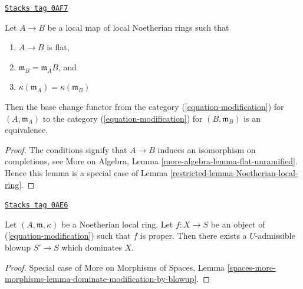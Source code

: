 \begin{lemma}
\label{restricted-lemma-equivalence-to-completion}
\href{https://stacks.math.columbia.edu/tag/0AF7}{\texttt{Stacks tag 0AF7}}

Let $A \to B$ be a local map of local Noetherian rings such that
\begin{enumerate}
\item $A \to B$ is flat,
\item $\mathfrak m_B = \mathfrak m_A B$, and
\item $\kappa(\mathfrak m_A) = \kappa(\mathfrak m_B)$
\end{enumerate}
Then the base change functor from the category
(\ref{equation-modification}) for $(A, \mathfrak m_A)$ to the category
(\ref{equation-modification}) for $(B, \mathfrak m_B)$
is an equivalence.
\end{lemma}

\begin{proof}

The conditions signify that $A \to B$ induces an isomorphism on
completions, see
More on Algebra, Lemma \ref{more-algebra-lemma-flat-unramified}.
Hence this lemma is a special case of
Lemma \ref{restricted-lemma-Noetherian-local-ring}.
\end{proof}

\begin{lemma}
\label{restricted-lemma-dominate-by-admissible-blowup}
\href{https://stacks.math.columbia.edu/tag/0AE6}{\texttt{Stacks tag 0AE6}}

Let $(A, \mathfrak m, \kappa)$ be a Noetherian local ring.
Let $f : X \to S$ be an object of (\ref{equation-modification})
such that $f$ is proper.
Then there exists a $U$-admissible blowup $S' \to S$
which dominates $X$.
\end{lemma}

\begin{proof}
Special case of More on Morphisms of Spaces,
Lemma \ref{spaces-more-morphisms-lemma-dominate-modification-by-blowup}.
\end{proof}



